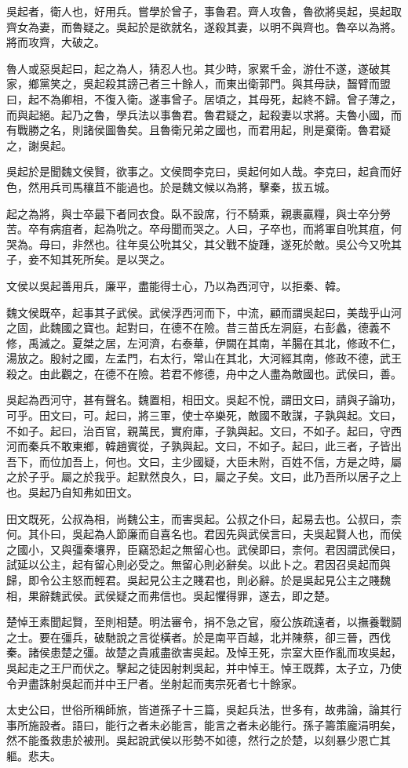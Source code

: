 吳起者，衛人也，好用兵。嘗學於曾子，事魯君。齊人攻魯，魯欲將吳起，吳起取齊女為妻，而魯疑之。吳起於是欲就名，遂殺其妻，以明不與齊也。魯卒以為將。將而攻齊，大破之。

魯人或惡吳起曰，起之為人，猜忍人也。其少時，家累千金，游仕不遂，遂破其家，鄉黨笑之，吳起殺其謗己者三十餘人，而東出衛郭門。與其母訣，齧臂而盟曰，起不為卿相，不復入衛。遂事曾子。居頃之，其母死，起終不歸。曾子薄之，而與起絕。起乃之魯，學兵法以事魯君。魯君疑之，起殺妻以求將。夫魯小國，而有戰勝之名，則諸侯圖魯矣。且魯衛兄弟之國也，而君用起，則是棄衛。魯君疑之，謝吳起。

吳起於是聞魏文侯賢，欲事之。文侯問李克曰，吳起何如人哉。李克曰，起貪而好色，然用兵司馬穰苴不能過也。於是魏文候以為將，擊秦，拔五城。

起之為將，與士卒最下者同衣食。臥不設席，行不騎乘，親裹贏糧，與士卒分勞苦。卒有病疽者，起為吮之。卒母聞而哭之。人曰，子卒也，而將軍自吮其疽，何哭為。母曰，非然也。往年吳公吮其父，其父戰不旋踵，遂死於敵。吳公今又吮其子，妾不知其死所矣。是以哭之。

文侯以吳起善用兵，廉平，盡能得士心，乃以為西河守，以拒秦、韓。

魏文侯既卒，起事其子武侯。武侯浮西河而下，中流，顧而謂吳起曰，美哉乎山河之固，此魏國之寶也。起對曰，在德不在險。昔三苗氏左洞庭，右彭蠡，德義不修，禹滅之。夏桀之居，左河濟，右泰華，伊闕在其南，羊腸在其北，修政不仁，湯放之。殷紂之國，左孟門，右太行，常山在其北，大河經其南，修政不德，武王殺之。由此觀之，在德不在險。若君不修德，舟中之人盡為敵國也。武侯曰，善。

吳起為西河守，甚有聲名。魏置相，相田文。吳起不悅，謂田文曰，請與子論功，可乎。田文曰，可。起曰，將三軍，使士卒樂死，敵國不敢謀，子孰與起。文曰，不如子。起曰，治百官，親萬民，實府庫，子孰與起。文曰，不如子。起曰，守西河而秦兵不敢東鄉，韓趙賓從，子孰與起。文曰，不如子。起曰，此三者，子皆出吾下，而位加吾上，何也。文曰，主少國疑，大臣未附，百姓不信，方是之時，屬之於子乎。屬之於我乎。起默然良久，曰，屬之子矣。文曰，此乃吾所以居子之上也。吳起乃自知弗如田文。

田文既死，公叔為相，尚魏公主，而害吳起。公叔之仆曰，起易去也。公叔曰，柰何。其仆曰，吳起為人節廉而自喜名也。君因先與武侯言曰，夫吳起賢人也，而侯之國小，又與彊秦壤界，臣竊恐起之無留心也。武侯即曰，柰何。君因謂武侯曰，試延以公主，起有留心則必受之。無留心則必辭矣。以此卜之。君因召吳起而與歸，即令公主怒而輕君。吳起見公主之賤君也，則必辭。於是吳起見公主之賤魏相，果辭魏武侯。武侯疑之而弗信也。吳起懼得罪，遂去，即之楚。

楚悼王素聞起賢，至則相楚。明法審令，捐不急之官，廢公族疏遠者，以撫養戰鬬之士。要在彊兵，破馳說之言從橫者。於是南平百越，北并陳蔡，卻三晉，西伐秦。諸侯患楚之彊。故楚之貴戚盡欲害吳起。及悼王死，宗室大臣作亂而攻吳起，吳起走之王尸而伏之。擊起之徒因射刺吳起，并中悼王。悼王既葬，太子立，乃使令尹盡誅射吳起而并中王尸者。坐射起而夷宗死者七十餘家。

太史公曰，世俗所稱師旅，皆道孫子十三篇，吳起兵法，世多有，故弗論，論其行事所施設者。語曰，能行之者未必能言，能言之者未必能行。孫子籌策龐涓明矣，然不能蚤救患於被刑。吳起說武侯以形勢不如德，然行之於楚，以刻暴少恩亡其軀。悲夫。